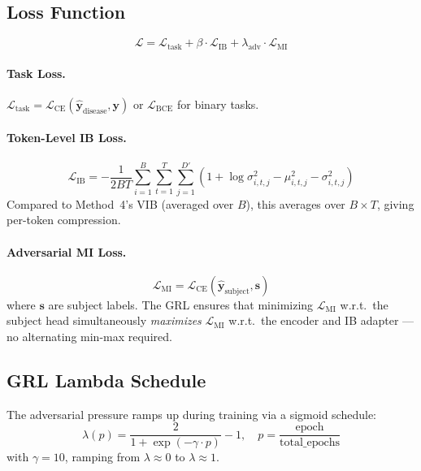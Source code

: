 \documentclass{article}
\newcommand{\mL}{\mathcal{L}}
\begin{document}
\subsection{Loss Function}

\begin{equation}
\mL = \mL_\text{task} + \beta \cdot \mL_\text{IB} + \lambda_\text{adv} \cdot \mL_\text{MI}
\end{equation}

\paragraph{Task Loss.}
$\mL_\text{task} = \mL_\text{CE}(\hat{\bm{y}}_\text{disease}, \bm{y})$ or $\mL_\text{BCE}$ for binary tasks.

\paragraph{Token-Level IB Loss.}
\begin{equation}
\mL_\text{IB} = -\frac{1}{2BT} \sum_{i=1}^{B} \sum_{t=1}^{T} \sum_{j=1}^{D'} \left(1 + \log\sigma^2_{i,t,j} - \mu^2_{i,t,j} - \sigma^2_{i,t,j}\right)
\end{equation}
Compared to Method~4's VIB (averaged over $B$), this averages over $B \times T$, giving per-token compression.

\paragraph{Adversarial MI Loss.}
\begin{equation}
\mL_\text{MI} = \mL_\text{CE}(\hat{\bm{y}}_\text{subject}, \bm{s})
\end{equation}
where $\bm{s}$ are subject labels. The GRL ensures that minimizing $\mL_\text{MI}$ w.r.t.\ the subject head simultaneously \emph{maximizes} $\mL_\text{MI}$ w.r.t.\ the encoder and IB adapter --- no alternating min-max required.

\subsection{GRL Lambda Schedule}

The adversarial pressure ramps up during training via a sigmoid schedule:
\begin{equation}
\lambda(p) = \frac{2}{1 + \exp(-\gamma \cdot p)} - 1, \quad p = \frac{\text{epoch}}{\text{total\_epochs}}
\end{equation}
with $\gamma = 10$, ramping from $\lambda \approx 0$ to $\lambda \approx 1$.
\end{document}

